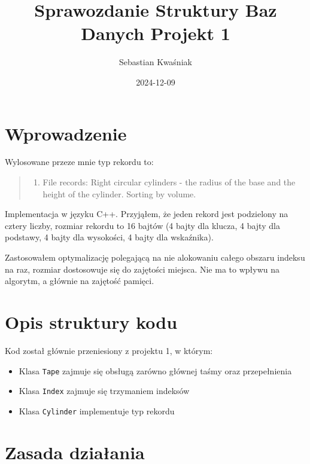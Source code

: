 \documentclass[
]{article}
\title{Sprawozdanie Struktury Baz Danych Projekt 1}
\author{Sebastian Kwaśniak}
\date{2024-12-09}
\providecommand{\tightlist}{%
  \setlength{\itemsep}{0pt}\setlength{\parskip}{0pt}}
\begin{document}
\maketitle

\renewcommand{\figurename}{Rys.}

\section{Wprowadzenie}\label{wprowadzenie}

Wylosowane przeze mnie typ rekordu to:

\begin{quote}
\begin{enumerate}
\def\labelenumi{\arabic{enumi}.}
\setcounter{enumi}{28}
\tightlist
\item
  File records: Right circular cylinders - the radius of the base and
  the height of the cylinder. Sorting by volume.
\end{enumerate}
\end{quote}

Implementacja w języku C++. Przyjąłem, że jeden rekord jest podzielony
na cztery liczby, rozmiar rekordu to 16 bajtów (4 bajty dla klucza, 4
bajty dla podstawy, 4 bajty dla wysokości, 4 bajty dla wskaźnika).

Zastosowałem optymalizację polegającą na nie alokowaniu całego obszaru
indeksu na raz, rozmiar dostosowuje się do zajętości miejsca. Nie ma to
wpływu na algorytm, a głównie na zajętość pamięci.

\section{Opis struktury kodu}\label{opis-struktury-kodu}

Kod został głównie przeniesiony z projektu 1, w którym:

\begin{itemize}
\tightlist
\item
  Klasa \texttt{Tape} zajmuje się obsługą zarówno głównej taśmy oraz
  przepełnienia
\item
  Klasa \texttt{Index} zajmuje się trzymaniem indeksów
\item
  Klasa \texttt{Cylinder} implementuje typ rekordu
\end{itemize}

\section{Zasada działania}\label{zasada-dziaux142ania}
\end{document}
